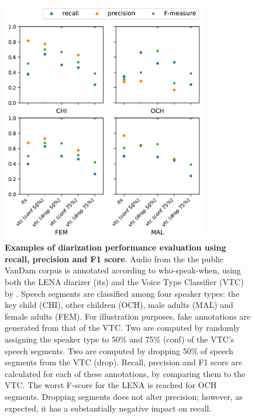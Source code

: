 \documentclass[smallextended]{svjour3}       %
\begin{document}
\begin{figure}[htb]

\centering
\includegraphics[width=0.8\textwidth]{Fig4.pdf}

\caption{\label{fig:precision}\textbf{Examples of diarization performance evaluation using recall, precision and F1 score}. Audio from the the public VanDam corpus \citep{vandam-day} is annotated according to who-speak-when, using both the LENA diarizer (its) and the Voice Type Classifier (VTC) by \citet{lavechin2020opensource}. Speech segments are classified among four speaker types: the key child (CHI), other children (OCH), male adults (MAL) and female adults (FEM). For illustration purposes, fake annotations are generated from that of the VTC. Two are computed by randomly assigning the speaker type to 50\% and 75\% (conf) of the VTC's speech segments. Two are computed by dropping 50\% of speech segments from the VTC (drop). Recall, precision and F1 score are calculated for each of these annotations, by comparing them to the VTC. The worst F-score for the LENA is reached for OCH segments. Dropping segments does not alter precision; however, as expected, it has a substantially negative impact on recall.
}

\end{figure}
\end{document}
